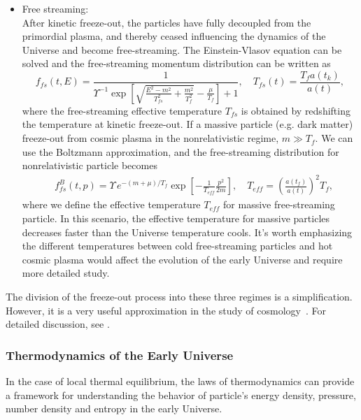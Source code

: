 \begin{itemize}
\item{Free streaming:}\\
After kinetic freeze-out, the particles have fully decoupled from the primordial plasma, and thereby ceased influencing the dynamics of the Universe and become free-streaming. The Einstein-Vlasov equation can be solved \cite{Choquet-Bruhat:2009xil} and the free-streaming momentum distribution can be written as \cite{Birrell:2012gg}
\begin{equation}\label{free_stream_dist}
f_{fs}(t,E)=\frac{1}{\Upsilon^{-1}\exp{\left[\sqrt{\frac{E^2-m^2}{T_{fs}^2}+\frac{m^2}{T^2_f}}-\frac{\mu}{T_f}\right]+1}},\quad T_{fs}(t)=\frac{T_fa(t_k)}{a(t)},
\end{equation}
where the free-streaming effective temperature $T_{fs}$ is obtained by redshifting the temperature at kinetic freeze-out. If a massive particle (e.g. dark matter) freeze-out from cosmic plasma in the nonrelativistic regime, $m\gg T_f$. We can use the
Boltzmann approximation, and the free-streaming distribution for nonrelativistic particle becomes
\begin{align}
&f^B_{fs}(t,p)=\Upsilon\,e^{-(m+\mu)/T_f}\exp\left[-\frac{1}{ T_{eff}}\frac{p^2}{2m}\right],\quad T_{eff}=\left(\frac{a(t_f)}{a(t)}\right)^2T_f,
\end{align}
where we define the effective temperature $T_{eff}$ for massive free-streaming particle. In this scenario, the effective temperature for massive particles decreases faster than the Universe temperature cools. It's worth emphasizing the different temperatures between cold free-streaming particles and hot cosmic plasma would affect the evolution of the early Universe and require more detailed study. 
\end{itemize}

The division of the freeze-out process into these three regimes is a simplification. However, it is a very useful approximation in the study of cosmology~\cite{Mangano:2005cc,Birrell:2014gea}. For detailed discussion, see \cite{Birrell:2012gg,Rafelski:2023emw}.

\subsubsection{Thermodynamics of the Early Universe}
In the case of local thermal equilibrium, the laws of thermodynamics can provide a framework for understanding the behavior of particle's energy density, pressure, number density and entropy in the early Universe.

